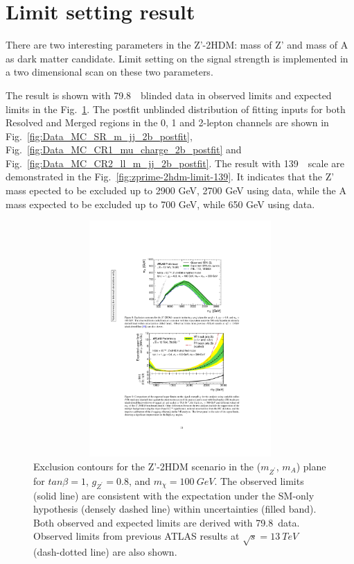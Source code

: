 \section{Limit setting result}
\label{sec:limitres}

\par There are two interesting parameters in the Z'-2HDM: mass of Z' and mass of A as dark matter candidate. 
Limit setting on the signal strength is implemented in a two dimensional scan on these two parameters.

\par The result is shown with 79.8~\ifb~blinded data in observed limits and expected limits in the Fig.~\ref{fig:zprime-2hdm-limit-80}. 
The postfit unblinded distribution of fitting inputs for both Resolved and Merged regions in the 0, 1 and 2-lepton channels are shown in Fig.~\ref{fig:Data_MC_SR_m_jj_2b_postfit}, Fig.~\ref{fig:Data_MC_CR1_mu_charge_2b_postfit} and Fig.~\ref{fig:Data_MC_CR2_ll_m_jj_2b_postfit}.
The result with 139~\ifb~scale are demonstrated in the Fig.~\ref{fig:zprime-2hdm-limit-139}. 
It indicates that the Z' mass epected to be excluded up to 2900 GeV, 2700 GeV using data, while the A mass expected to be excluded up to 700 GeV, while 650 GeV using data.

\begin{figure}[!htb]
    \centering
    \includegraphics[width=12cm, height=9cm, trim={6cm 17cm 5.8cm 4.5cm}, clip]{chapters/c9/figures/ZPrime2HDMLimit-80Exp.pdf}
    \caption{Exclusion contours for the Z'-2HDM scenario in the ($m_{Z^{\prime}}$, $m_{A}$) plane for $tan\beta= 1$, $g_{Z^{\prime}}=0.8$, and $m_{\chi}=100~GeV$. 
    The observed limits (solid line) are consistent with the expectation under the SM-only hypothesis (densely dashed line) within uncertainties (filled band). 
    Both observed and expected limits are derived with 79.8~\ifb data. 
    Observed limits from previous ATLAS results at $\sqrt{s}=13~TeV$ (dash-dotted line) are also shown.}
    \label{fig:zprime-2hdm-limit-80}
\end{figure}


